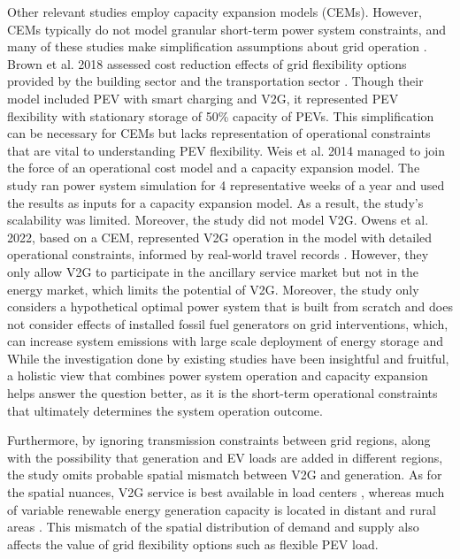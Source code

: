 \documentclass[9pt,twoside,lineno]{pnas-new}
\begin{document}
Other relevant studies employ capacity expansion models (CEMs). However, CEMs typically do not model granular short-term power system constraints, and many of these studies make simplification assumptions about grid operation \cite{brown_synergies_2018, owens_can_2022, manriquez_impact_2020}.  Brown et al. 2018 assessed cost reduction effects of grid flexibility options provided by the building sector and the transportation sector \cite{brown_synergies_2018}. Though their model included PEV with smart charging and V2G, it represented PEV flexibility with stationary storage of 50\% capacity of PEVs. This simplification can be necessary for CEMs but lacks representation of operational constraints that are vital to understanding PEV flexibility. Weis et al. 2014 managed to join the force of an operational cost model and a capacity expansion model\cite{weis_estimating_2014}. The study ran power system simulation for 4 representative weeks of a year and used the results as inputs for a capacity expansion model. As a result, the study's scalability was limited. Moreover, the study did not model V2G. Owens et al. 2022, based on a CEM, represented V2G operation in the model with detailed operational constraints, informed by real-world travel records \cite{owens_can_2022}. However, they only allow V2G to participate in the ancillary service market but not in the energy market, which limits the potential of V2G. Moreover, the study only considers a hypothetical optimal power system that is built from scratch and does not consider effects of installed fossil fuel generators on grid interventions, which, can increase system emissions with large scale deployment of energy storage and\cite{hittinger_bulk_2015} While the investigation done by existing studies have been insightful and fruitful, a holistic view that combines power system operation and capacity expansion helps answer the question better, as it is the short-term operational constraints that ultimately determines the system operation outcome. 

Furthermore, by ignoring transmission constraints between grid regions, along with the possibility that generation and EV loads are added in different regions, the study omits probable spatial mismatch between V2G and generation. As for the spatial nuances, V2G service is best available in load centers \cite{muratori_impact_2018,kahn_green_2009}, whereas much of variable renewable energy generation capacity is located in distant and rural areas \cite{brown_spatial_2020,vanatta_costs_2022}. This mismatch of the spatial distribution of demand and supply also affects the value of grid flexibility options such as flexible PEV load.
\end{document}
